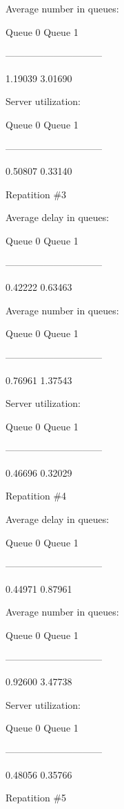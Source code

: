 \documentclass{article}
\begin{document}
 Average number in queues:
 
 Queue 0		Queue 1
 
 ------------------------------
 
 1.19039		3.01690
 


 Server utilization:
 
 Queue 0		Queue 1
 
 ------------------------------
 
 0.50807		0.33140
 


 Repatition \#3



 Average delay in queues:
 
 Queue 0		Queue 1
 
 ------------------------------
 
 0.42222		0.63463
 


 Average number in queues:
 
 Queue 0		Queue 1
 
 ------------------------------
 
 0.76961		1.37543
 


 Server utilization:
 
 Queue 0		Queue 1
 
 ------------------------------
 
 0.46696		0.32029
 


 Repatition \#4



 Average delay in queues:
 
 Queue 0		Queue 1
 
 ------------------------------
 
 0.44971		0.87961
 


 Average number in queues:
 
 Queue 0		Queue 1
 
 ------------------------------
 
 0.92600		3.47738		


Server utilization:

Queue 0		Queue 1

------------------------------

0.48056		0.35766



 Repatition \#5
\end{document}
